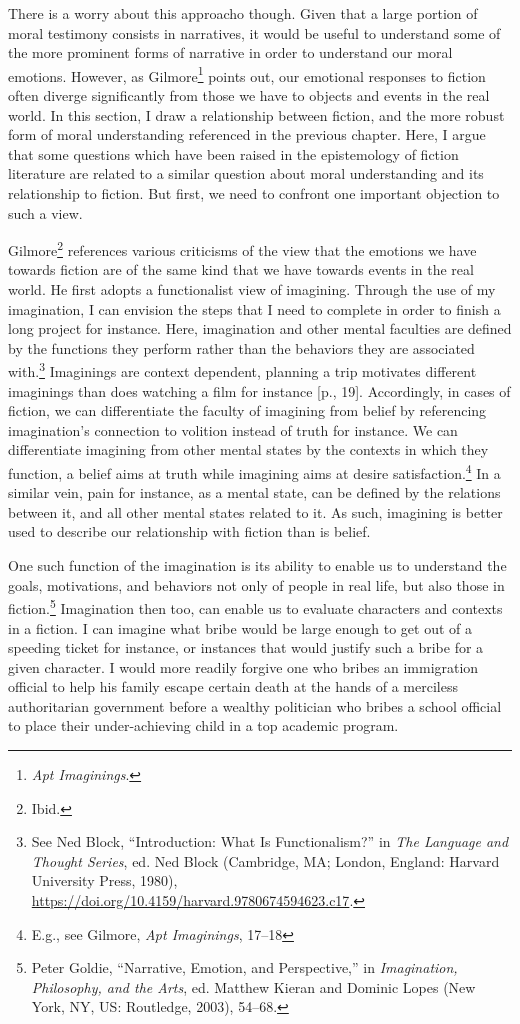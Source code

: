 \documentclass[phdthesis,12pt,final,a4paper]{wuthesis}
\theoremstyle{definition}
\theoremstyle{definition}
\theoremstyle{definition}
\theoremstyle{definition}
\theoremstyle{remark}
\begin{document}
There is a worry about this approacho though. Given that a large portion of moral testimony consists in narratives, it would be useful to understand some of the more prominent forms of narrative in order to understand our moral emotions. However, as Gilmore\footnote{\emph{Apt {Imaginings}}.} points out, our emotional responses to fiction often diverge significantly from those we have to objects and events in the real world. In this section, I draw a relationship between fiction, and the more robust form of moral understanding referenced in the previous chapter. Here, I argue that some questions which have been raised in the epistemology of fiction literature are related to a similar question about moral understanding and its relationship to fiction. But first, we need to confront one important objection to such a view.

Gilmore\footnote{Ibid.} references various criticisms of the view that the emotions we have towards fiction are of the same kind that we have towards events in the real world. He first adopts a functionalist view of imagining. Through the use of my imagination, I can envision the steps that I need to complete in order to finish a long project for instance. Here, imagination and other mental faculties are defined by the functions they perform rather than the behaviors they are associated with.\footnote{See Ned Block, {``Introduction: What Is Functionalism?''} in \emph{The {Language} and {Thought Series}}, ed. Ned Block (Cambridge, MA; London, England: Harvard University Press, 1980), \url{https://doi.org/10.4159/harvard.9780674594623.c17}.} Imaginings are context dependent, planning a trip motivates different imaginings than does watching a film for instance {[}p., 19{]}. Accordingly, in cases of fiction, we can differentiate the faculty of imagining from belief by referencing imagination's connection to volition instead of truth for instance. We can differentiate imagining from other mental states by the contexts in which they function, a belief aims at truth while imagining aims at desire satisfaction.\footnote{E.g., see Gilmore, \emph{Apt {Imaginings}}, 17--18} In a similar vein, pain for instance, as a mental state, can be defined by the relations between it, and all other mental states related to it. As such, imagining is better used to describe our relationship with fiction than is belief.

One such function of the imagination is its ability to enable us to understand the goals, motivations, and behaviors not only of people in real life, but also those in fiction.\footnote{Peter Goldie, {``Narrative, Emotion, and Perspective,''} in \emph{Imagination, {Philosophy}, and the {Arts}}, ed. Matthew Kieran and Dominic Lopes (New York, NY, US: Routledge, 2003), 54--68.} Imagination then too, can enable us to evaluate characters and contexts in a fiction. I can imagine what bribe would be large enough to get out of a speeding ticket for instance, or instances that would justify such a bribe for a given character. I would more readily forgive one who bribes an immigration official to help his family escape certain death at the hands of a merciless authoritarian government before a wealthy politician who bribes a school official to place their under-achieving child in a top academic program.
\end{document}
